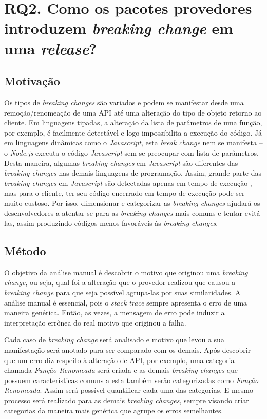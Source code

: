 \section{RQ2. Como os pacotes provedores introduzem \textit{breaking change} em uma \textit{release}?}
\label{sec:rq2}

\subsection{Motivação}
\label{mot:rq2}
Os tipos de \textit{breaking changes} são variados e podem se manifestar desde uma remoção/renomeação de uma \gls{API} até uma alteração do tipo de objeto retorno ao cliente. Em linguagens tipadas, a alteração da lista de parâmetros de uma função, por exemplo, é facilmente detectável e logo impossibilita a execução do código. Já em linguagens dinâmicas como o \textit{Javascript}, esta \textit{break change} nem se manifesta -- o \textit{Node.js} executa o código \textit{Javascript} sem se preocupar com lista de parâmetros. Desta maneira, algumas \textit{breaking changes} em \textit{Javascript} são diferentes das \textit{breaking changes} nas demais linguagens de programação. Assim, grande parte das \textit{breaking changes} em \textit{Javascript} são detectadas apenas em tempo de execução \cite{noregrets2018}, mas para o cliente, ter seu código encerrado em tempo de execução pode ser muito custoso. Por isso, dimensionar e categorizar as \textit{breaking changes} ajudará os desenvolvedores a atentar-se para as \textit{breaking changes} mais comuns e tentar evitá-las, assim produzindo códigos menos favoráveis às \textit{breaking changes}.

\subsection{Método}
\label{apr:rq2}

O objetivo da análise manual é descobrir o motivo que originou uma \textit{breaking change}, ou seja, qual foi a alteração que o provedor realizou que causou a \textit{breaking change} para que seja possível agrupa-las por suas similaridades. A análise manual é essencial, pois o \textit{stack trace} sempre apresenta o erro de uma maneira genérica. Então, as vezes, a mensagem de erro pode induzir a interpretação errônea do real motivo que originou a falha.

Cada caso de \textit{breaking change} será analisado e motivo que levou a sua manifestação será anotado para ser comparado com os demais. Após descobrir que um erro diz respeito à alteração de \gls{API}, por exemplo, uma categoria chamada \textit{Função Renomeada} será criada e as demais \textit{breaking changes} que possuem características comuns a esta também serão categorizadas como \textit{Função Renomeada}. Assim será possível quantificar cada uma das categorias. E mesmo processo será realizado para as demais \textit{breaking changes}, sempre visando criar categorias da maneira mais genérica que agrupe os erros semelhantes.

